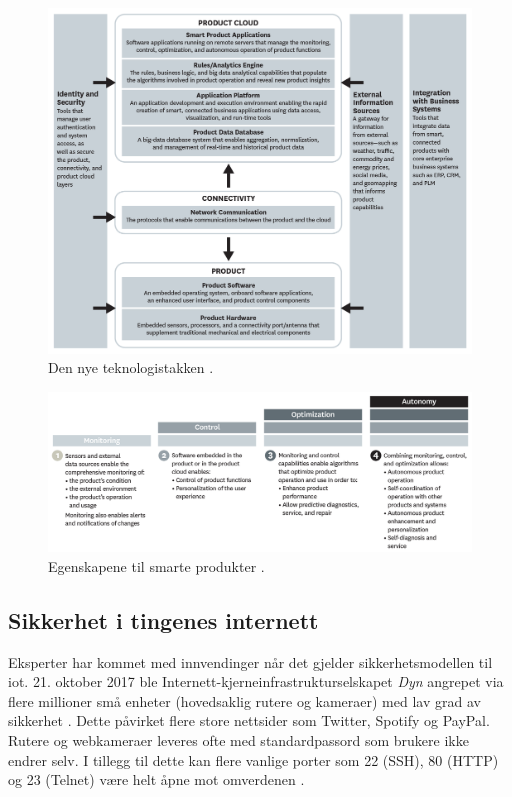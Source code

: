 \begin{figure}
\includegraphics[width=1.0\textwidth,center]{fig/harvard_technology}
\caption{Den nye teknologistakken \citep{iot_harvard_smart}.}
\label{fig:iot_harvard_smart}
\end{figure}

\begin{figure}
\includegraphics[width=1.0\textwidth,center]{fig/harvard_capabilities}
\caption{Egenskapene til smarte produkter \citep{iot_harvard_smart}.}
\label{fig:iot_harvard_capabilities}
\end{figure}


\subsection{Sikkerhet i tingenes internett}
Eksperter har kommet med innvendinger når det gjelder sikkerhetsmodellen til \gls{iot}.
21. oktober 2017 ble Internett-kjerneinfrastrukturselskapet \textit{Dyn} angrepet via flere millioner
små enheter (hovedsaklig rutere og kameraer) med lav grad av sikkerhet \citep{iot_attack_ddos}.
Dette påvirket flere store nettsider som Twitter, Spotify og PayPal. Rutere og webkameraer leveres
ofte med standardpassord som brukere ikke endrer selv. I tillegg til dette kan flere vanlige
porter som 22 (SSH), 80 (HTTP) og 23 (Telnet) være helt åpne mot omverdenen \citep{iot_mirai_botnet}.

